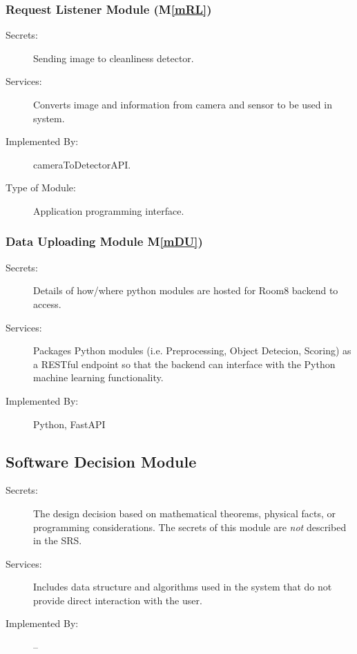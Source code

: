 \documentclass[12pt, titlepage]{article}
\newcommand{\mref}[1]{M\ref{#1}}
\begin{document}
\subsubsection{Request Listener Module (\mref{mRL})}

\begin{description}
\item[Secrets:] Sending image to cleanliness detector.
\item[Services:] Converts image and information from camera and sensor to be used in system.
\item[Implemented By:] cameraToDetectorAPI.
\item[Type of Module:] Application programming interface.
\end{description}

\subsubsection{Data Uploading Module \mref{mDU})}

\begin{description}
\item[Secrets:] Details of how/where python modules are hosted for Room8 backend to access.
\item[Services:] Packages Python modules (i.e. Preprocessing, Object Detecion, Scoring) as a RESTful endpoint so that the backend can interface with the Python machine learning functionality.
\item[Implemented By:] Python, FastAPI
\end{description}


\subsection{Software Decision Module}

\begin{description}
\item[Secrets:] The design decision based on mathematical theorems, physical
  facts, or programming considerations. The secrets of this module are
  \emph{not} described in the SRS.
\item[Services:] Includes data structure and algorithms used in the system that
  do not provide direct interaction with the user. 
\item[Implemented By:] --
\end{description}
\end{document}

